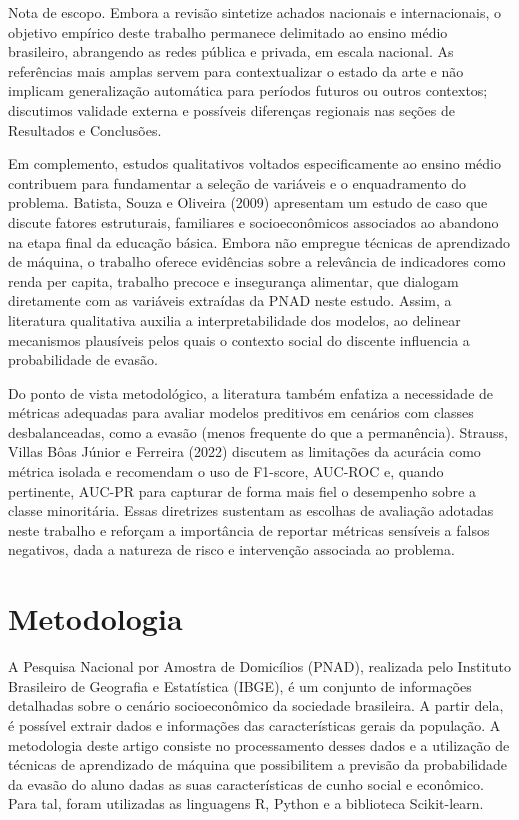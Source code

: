 \documentclass[english, spanish, brazilian]{RBIEarticle} %
\begin{document}
Nota de escopo. Embora a revisão sintetize achados nacionais e internacionais, o objetivo empírico
deste trabalho permanece delimitado ao ensino médio brasileiro, abrangendo as redes pública e
privada, em escala nacional. As referências mais amplas servem para contextualizar o estado da
arte e não implicam generalização automática para períodos futuros ou outros contextos;
discutimos validade externa e possíveis diferenças regionais nas seções de Resultados e
Conclusões.

Em complemento, estudos qualitativos voltados especificamente ao ensino médio contribuem para
fundamentar a seleção de variáveis e o enquadramento do problema. Batista, Souza e Oliveira
(2009) apresentam um estudo de caso que discute fatores estruturais, familiares e socioeconômicos
associados ao abandono na etapa final da educação básica. Embora não empregue técnicas de
aprendizado de máquina, o trabalho oferece evidências sobre a relevância de indicadores como
renda per capita, trabalho precoce e insegurança alimentar, que dialogam diretamente com as
variáveis extraídas da PNAD neste estudo. Assim, a literatura qualitativa auxilia a interpretabilidade
dos modelos, ao delinear mecanismos plausíveis pelos quais o contexto social do discente
influencia a probabilidade de evasão.

Do ponto de vista metodológico, a literatura também enfatiza a necessidade de métricas adequadas
para avaliar modelos preditivos em cenários com classes desbalanceadas, como a evasão (menos
frequente do que a permanência). Strauss, Villas Bôas Júnior e Ferreira (2022) discutem as
limitações da acurácia como métrica isolada e recomendam o uso de F1-score, AUC-ROC e, quando
pertinente, AUC-PR para capturar de forma mais fiel o desempenho sobre a classe minoritária.
Essas diretrizes sustentam as escolhas de avaliação adotadas neste trabalho e reforçam a importância
de reportar métricas sensíveis a falsos negativos, dada a natureza de risco e intervenção associada ao
problema.



\section{Metodologia}
A Pesquisa Nacional por Amostra de Domicílios (PNAD), realizada pelo Instituto Brasileiro de Geografia e Estatística (IBGE), é um conjunto de informações detalhadas sobre o cenário socioeconômico da sociedade brasileira. A partir dela, é possível extrair dados e informações das características gerais da população. A metodologia deste artigo consiste no processamento desses dados e a utilização de técnicas de aprendizado de máquina que possibilitem a previsão da probabilidade da evasão do aluno dadas as suas características de cunho social e econômico. Para tal, foram utilizadas as linguagens R, Python e a biblioteca Scikit-learn.
\end{document}
